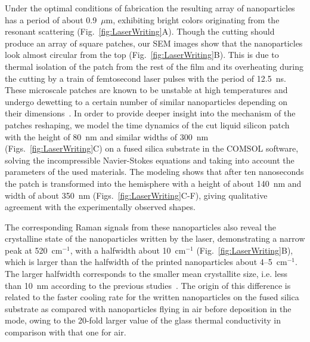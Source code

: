             Under the optimal conditions of fabrication the resulting array of nanoparticles has a period of about 0.9~$\mu$m,
            exhibiting bright colors originating from the resonant scattering (Fig.~\ref{fig:LaserWriting}A). Though the cutting should
            produce an array of square patches, our SEM images show that the nanoparticles look almost circular from the top
            (Fig.~\ref{fig:LaserWriting}B). This is due to thermal isolation of the patch from the rest of the film and its overheating
            during the cutting by a train of femtosecond laser pulses with the period of 12.5~ns. These microscale patches are
            known to be unstable at high temperatures and undergo dewetting to a certain number of similar nanoparticles depending
            on their dimensions~\cite{thompson2012solid}. In order to provide deeper insight into the mechanism of the patches reshaping,
            we model the time dynamics of the cut liquid silicon patch with the height of 80~nm and similar widths of 300~nm
            (Figs.~\ref{fig:LaserWriting}C) on a fused silica substrate in the COMSOL software, solving the incompressible Navier-Stokes
            equations and taking into account the parameters of the used materials. The modeling shows that after ten nanoseconds
            the patch is transformed into the hemisphere with a height of about 140~nm and width of about 350~nm (Figs.~\ref{fig:LaserWriting}C-F),
            giving qualitative agreement with the experimentally observed shapes.

            The corresponding Raman signals from these nanoparticles also reveal the crystalline state of the nanoparticles written
            by the laser, demonstrating a narrow peak at 520~cm$^{-1}$, with a halfwidth about 10~cm$^{-1}$ (Fig.~\ref{fig:LaserWriting}B),
            which is larger than the halfwidth of the printed nanoparticles about 4--5~cm$^{-1}$. The larger halfwidth corresponds
            to the smaller mean crystallite size, i.e. less than 10~nm according to the previous studies~\cite{campbell1986effects}.
            The origin of this difference is related to the faster cooling rate for the written nanoparticles on the fused silica
            substrate as compared with nanoparticles flying in air before deposition in the  mode, owing to the 20-fold
            larger value of the glass thermal conductivity in comparison with that one for air.

